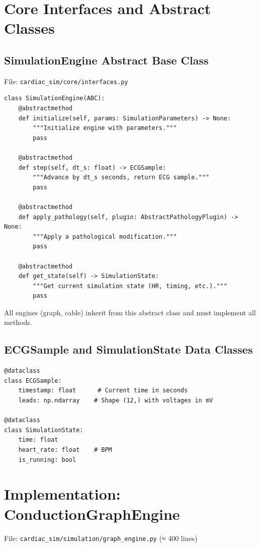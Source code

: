 \documentclass[12pt,a4paper,oneside]{book}
\begin{document}
\section{Core Interfaces and Abstract Classes}

\subsection{SimulationEngine Abstract Base Class}

File: \texttt{cardiac\_sim/core/interfaces.py}

\begin{lstlisting}
class SimulationEngine(ABC):
    @abstractmethod
    def initialize(self, params: SimulationParameters) -> None:
        """Initialize engine with parameters."""
        pass
    
    @abstractmethod
    def step(self, dt_s: float) -> ECGSample:
        """Advance by dt_s seconds, return ECG sample."""
        pass
    
    @abstractmethod
    def apply_pathology(self, plugin: AbstractPathologyPlugin) -> None:
        """Apply a pathological modification."""
        pass
    
    @abstractmethod
    def get_state(self) -> SimulationState:
        """Get current simulation state (HR, timing, etc.)."""
        pass
\end{lstlisting}

All engines (graph, cable) inherit from this abstract class and must implement all methods.

\subsection{ECGSample and SimulationState Data Classes}

\begin{lstlisting}
@dataclass
class ECGSample:
    timestamp: float      # Current time in seconds
    leads: np.ndarray    # Shape (12,) with voltages in mV
    
@dataclass
class SimulationState:
    time: float
    heart_rate: float    # BPM
    is_running: bool
\end{lstlisting}

\section{\phaseI Implementation: ConductionGraphEngine}

File: \texttt{cardiac\_sim/simulation/graph\_engine.py} (≈ 400 lines)
\end{document}

